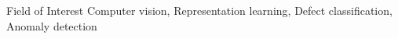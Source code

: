 \begin{rSection}{Field of Interest}
Computer vision, Representation learning, Defect classification, Anomaly detection
\end{rSection}

